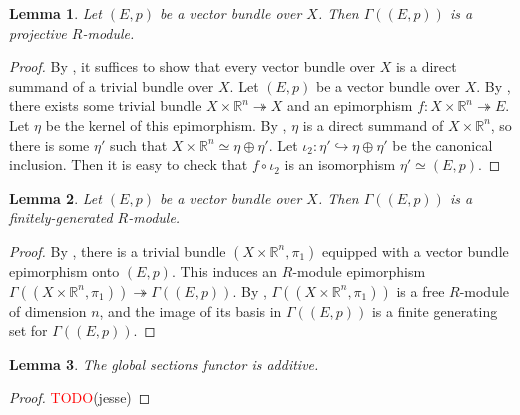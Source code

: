 \documentclass[11pt]{article}
\newcommand{\R}{\mathbb{R}}
\newcommand{\remph}[1]{\textcolor{red}{#1}}
\newcommand{\TODO}{\remph{TODO}}
\theoremstyle{plain}
\newtheorem{lemma}{Lemma}[section]
\theoremstyle{definition}
\begin{document}

\begin{lemma}
  \label{lemma:global-sections-projective}
  Let \((E,p)\) be a vector bundle over \(X\). Then \(\Gamma((E,p))\) is a projective \(R\)-module.
\end{lemma}

\begin{proof}
  By , it suffices to show that every vector bundle over \(X\) is a direct summand of a trivial bundle over \(X\). Let \((E,p)\) be a vector bundle over \(X\). By , there exists some trivial bundle \(X \times \R^n \twoheadrightarrow X\) and an epimorphism \(f : X \times \R^n \twoheadrightarrow E\). Let \(\eta\) be the kernel of this epimorphism. By , \(\eta\) is a direct summand of \(X \times \R^n\), so there is some \(\eta'\) such that \(X \times \R^n \simeq \eta \oplus \eta'\). Let \(\iota_2 : \eta' \hookrightarrow \eta \oplus \eta'\) be the canonical inclusion. Then it is easy to check that \(f \circ \iota_2\) is an isomorphism \(\eta' \simeq (E,p)\).
\end{proof}

\begin{lemma}\label{lemma:global-sections-fg}
  Let \((E,p)\) be a vector bundle over \(X\). Then \(\Gamma((E,p))\) is a finitely-generated \(R\)-module.
\end{lemma}

\begin{proof}
  By , there is a trivial bundle \((X \times \R^n, \pi_1)\) equipped with a vector bundle epimorphism onto \((E,p)\). This induces an \(R\)-module epimorphism \(\Gamma((X \times \R^n, \pi_1)) \twoheadrightarrow \Gamma((E,p))\). By , \(\Gamma((X \times \R^n, \pi_1))\) is a free \(R\)-module of dimension \(n\), and the image of its basis in \(\Gamma((E,p))\) is a finite generating set for \(\Gamma((E,p))\).
\end{proof}

\begin{lemma}\label{lemma:global-sections-additive}
  The global sections functor is additive.
\end{lemma}

\begin{proof}
  \TODO(jesse)
\end{proof}
\end{document}
